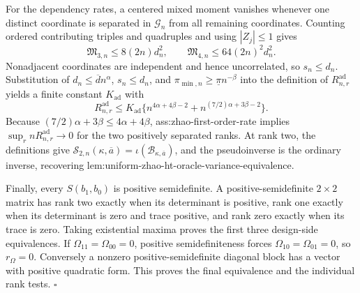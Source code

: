 For the dependency rates, a centered mixed moment vanishes whenever one distinct coordinate is separated in \(\mathcal G_n\) from all remaining coordinates.  Counting ordered contributing triples and quadruples and using \(|Z_j|\le1\) gives
\[
\mathfrak M_{3,n}\le8(2n)d_n^2,
\qquad
\mathfrak M_{4,n}\le64(2n)^2d_n^2.
\tag{15}
\]
Nonadjacent coordinates are independent and hence uncorrelated, so \(s_n\le d_n\).  Substitution of \(d_n\le\overline d n^\alpha\), \(s_n\le d_n\), and \(\pi_{\min,n}\ge\underline\pi n^{-\beta}\) into the definition of \(R_{n,r}^{\mathrm{ad}}\) yields a finite constant \(K_{\mathrm{ad}}\) with
\[
R_{n,r}^{\mathrm{ad}}
\le K_{\mathrm{ad}}
\{n^{4\alpha+4\beta-2}+n^{(7/2)\alpha+3\beta-2}\}.
\tag{16}
\]
Because \((7/2)\alpha+3\beta\le4\alpha+4\beta\), ass:zhao-first-order-rate implies \(\sup_r nR_{n,r}^{\mathrm{ad}}\to0\) for the two positively separated ranks.  At rank two, the definitions give \(\mathcal S_{2,n}(\kappa,\overline a)=\iota(\mathcal B_{\kappa,\overline a})\), and the pseudoinverse is the ordinary inverse, recovering lem:uniform-zhao-ht-oracle-variance-equivalence.

Finally, every \(S(b_1,b_0)\) is positive semidefinite.  A positive-semidefinite \(2\times2\) matrix has rank two exactly when its determinant is positive, rank one exactly when its determinant is zero and trace positive, and rank zero exactly when its trace is zero.  Taking existential maxima proves the first three design-side equivalences.  If \(\Omega_{11}=\Omega_{00}=0\), positive semidefiniteness forces \(\Omega_{10}=\Omega_{01}=0\), so \(r_\Omega=0\).  Conversely a nonzero positive-semidefinite diagonal block has a vector with positive quadratic form.  This proves the final equivalence and the individual rank tests. \(\square\)